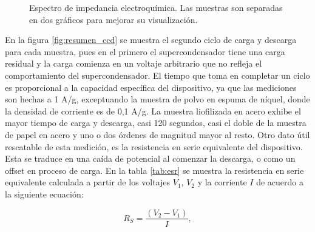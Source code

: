 \begin{figure}[h!]
\begin{subfigure}[t!]{0.4\textwidth}
	\end{subfigure}
	\caption{Espectro de impedancia electroquímica. Las muestras son separadas en dos gráficos para mejorar su visualización.}
	\label{fig:resumen_eis}
\end{figure}

En la figura \ref{fig:resumen_ccd} se muestra el segundo ciclo de carga y descarga para cada muestra, pues en el primero el supercondensador tiene una carga residual y la carga comienza en un voltaje arbitrario que no refleja el comportamiento del supercondensador. El tiempo que toma en completar un ciclo es proporcional a la capacidad específica del dispositivo, ya que las mediciones son hechas a 1 A/g, exceptuando la muestra de polvo en espuma de níquel, donde la densidad de corriente es de 0,1 A/g.
La muestra liofilizada en acero exhibe el mayor tiempo de carga y descarga, casi 120 segundos, casi el doble de la muestra de papel en acero y uno o dos órdenes de magnitud mayor al resto.
Otro dato útil rescatable de esta medición, es la resistencia en serie equivalente del dispositivo. Esta se traduce en una caída de potencial al comenzar la descarga, o como un offset en proceso de carga. En la tabla \ref{tab:esr} se muestra la resistencia en serie equivalente calculada a partir de los voltajes $V_1$, $V_2$ y la corriente $I$ de acuerdo a la siguiente ecuación:

\begin{equation}
	R_{S}=\frac{\left(V_2-V_1\right)}{I},
\end{equation}

